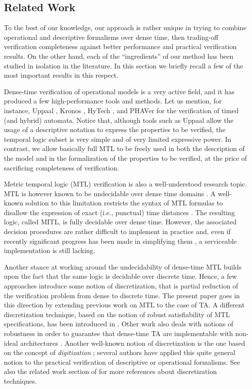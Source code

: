 \documentclass[a4paper]{article}
\theoremstyle{plain}
\theoremstyle{definition}
\begin{document}
\subsection{Related Work} \label{sec:relatedword}
To the best of our knowledge, our approach is rather unique in trying to combine operational and descriptive formalisms over dense time, then trading-off verification completeness against better performance and practical verification results.
On the other hand, each of the ``ingredients'' of our method has been studied in isolation in the literature.
In this section we briefly recall a few of the most important results in this respect.

Dense-time verification of operational models is a very active field, and it has produced a few high-performance tools and methods.
Let us mention, for instance, Uppaal \cite{LPY97}, Kronos \cite{Yov97}, HyTech \cite{HHW97}, and PHAVer \cite{Fre05} for the verification of timed (and hybrid) automata.
Notice that, although tools such as Uppaal allow the usage of a descriptive notation to express the properties to be verified, the temporal logic subset is very simple and of very limited expressive power.
In contrast, we allow basically full MTL to be freely used in both the description of the model and in the formalization of the properties to be verified, at the price of sacrificing completeness of verification.

Metric temporal logic (MTL) verification is also a well-understood research topic.
MTL is however known to be undecidable over dense time domains \cite{AH93}.
A well-known solution to this limitation restricts the syntax of MTL formulas to disallow the expression of exact (i.e., punctual) time distances \cite{AFH96}.
The resulting logic, called MITL, is fully decidable over dense time.
However, the associated decision procedures are rather difficult to implement in practice and, even if recently significant progress has been made in simplifying them \cite{MNP06}, a serviceable implementation is still lacking.

Another stance at working around the undecidability of dense-time MTL builds upon the fact that the same logic is decidable over discrete time.
Hence, a few approaches introduce some notion of discretization, that is partial reduction of the verification problem from dense to discrete time.
The present paper goes in this direction by extending previous work on MTL \cite{FPR08-FM08} to the case of TA.
A different discretization technique, based on the notion of robust satisfiability of MTL specifications, has been introduced in \cite{FP07}.
Other work also deals with notions of robustness in order to guarantee that dense-time TA are implementable with non-ideal architectures \cite{DWDR05}.
Another well-known notion of discretization is the one based on the concept of \emph{digitization} \cite{HMP92}; several authors have applied this quite general notion to the practical verification of descriptive \cite{Oua02,VHG96,CP03,SPC05} or operational \cite{GPV94,KP05,BER94,Bos99,MP95,BMT99,BLN03,OW03,CLT07} formalisms.
See also the related work section of \cite{FPR08-FM08} for more references about discretization techniques.
\end{document}
